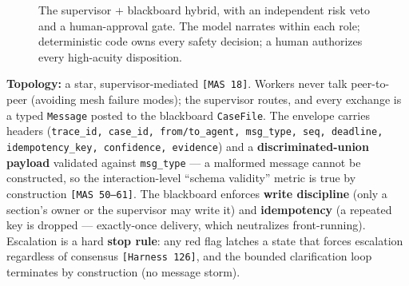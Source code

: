 \documentclass[11pt]{article}
\newcommand{\code}[1]{\texttt{#1}}
\begin{document}
\begin{figure}[h]
\centering
{}
\caption{The supervisor + blackboard hybrid, with an independent risk veto and a human-approval
gate. The model narrates within each role; deterministic code owns every safety decision; a human
authorizes every high-acuity disposition.}
\end{figure}

\textbf{Topology:} a star, supervisor-mediated \code{[MAS 18]}. Workers never talk peer-to-peer
(avoiding mesh failure modes); the supervisor routes, and every exchange is a typed
\code{Message} posted to the blackboard \code{CaseFile}. The envelope carries headers
(\code{trace\_id, case\_id, from/to\_agent, msg\_type, seq, deadline, idempotency\_key,
confidence, evidence}) and a \textbf{discriminated-union payload} validated against
\code{msg\_type} --- a malformed message cannot be constructed, so the interaction-level
``schema validity'' metric is true by construction \code{[MAS 50--61]}. The blackboard enforces
\textbf{write discipline} (only a section's owner or the supervisor may write it) and
\textbf{idempotency} (a repeated key is dropped --- exactly-once delivery, which neutralizes
front-running). Escalation is a hard \textbf{stop rule}: any red flag latches a state that forces
escalation regardless of consensus \code{[Harness 126]}, and the bounded clarification loop
terminates by construction (no message storm).
\end{document}
